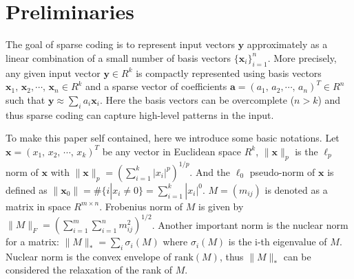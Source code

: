 \section{Preliminaries}
The goal of sparse coding is to represent input vectors $\mathbf{y}$ approximately as a linear combination of a small number of basis vectors $\{\mathbf{x}_i\}_{i=1}^n$.
More precisely, any given input vector $\mathbf{y}\in R^k$ is compactly represented using basis vectors $\mathbf{x}_1,\,\mathbf{x}_2,\cdots,\,\mathbf{x}_n\in R^k$ and a sparse vector of coefficients $\mathbf{a}=(a_1,\,a_2,\cdots ,\,a_n)^T\in R^n$ such that $\mathbf{y} \approx \sum_i a_i\mathbf{x}_i$.
Here the basis vectors can be overcomplete ($n>k$) and thus sparse coding can capture high-level patterns in the input.

To make this paper self contained, here we introduce some basic notations.
Let $\mathbf{x}=(x_1,\,x_2,\,\cdots ,\,x_k)^T$ be any vector in Euclidean space $R^k$, $\|\mathbf{x}\|_p$  is the $\ell_p$ norm of $\mathbf{x}$ with $\|\mathbf{x}\|_p=(\sum_{i=1}^k |x_i|^p)^{1/p}$. And the $\ell_0$ pseudo-norm of $\mathbf{x}$ is defined as $\|\mathbf{x}_0\|=\#\{i|x_i\neq 0\}=\sum_{i=1}^k |x_i|^0$.
$M=(m_{ij})$ is denoted as a matrix in space $R^{m\times n}$.
Frobenius norm of $M$ is given by $\|M\|_F=(\sum_{i=1}^m\sum_{i=1}^n m_{ij}^2)^{1/2}$.
Another important norm is the nuclear norm for a matrix: $\|M\|_* = \sum_i \sigma_i(M)$ where $\sigma_i(M)$ is the i-th eigenvalue of $M$.
Nuclear norm is the convex envelope of $\mathrm{rank}(M)$, thus $\|M\|_*$ can be considered the relaxation of the rank of $M$.
